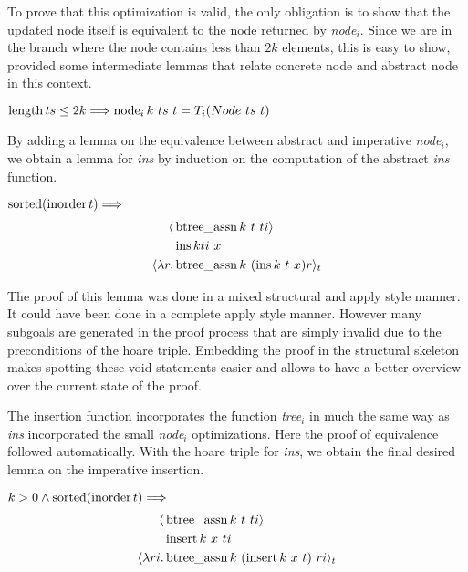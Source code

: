 To prove that this optimization is valid, the only obligation
is to show that the updated node itself is equivalent
to the node returned by \textit{node$_i$}.
Since we are in the branch where the node contains less than $2k$
elements, this is easy to show, provided some intermediate lemmas
that relate concrete node and abstract node in this context.

\begin{lemma}$\operatorname{length} ts \leq 2k \Longrightarrow
    \operatorname{node}_i k\ ts\ t = T_i (Node\ ts\ t)$
\end{lemma}

\begin{samepage}
By adding a lemma on the equivalence between abstract and imperative
\textit{node$_i$}, we obtain a lemma for \textit{ins}
by induction on the computation
of the abstract \textit{ins} function.

\begin{lemma} $\operatorname{sorted} (\operatorname{inorder} t) \Longrightarrow$ \\
    \begin{align*}
       \langle &\operatorname{btree\_assn} k\ t\ ti\rangle \\
               &\operatorname{ins} k ti\ x \\
       \langle \lambda r. &\operatorname{btree\_assn} k\ (\operatorname{ins} k\ t\ x) r\rangle_t
    \end{align*}
\end{lemma}
\end{samepage}

The proof of this lemma was done in a mixed structural and apply style manner.
It could have been done in a complete apply style manner.
However many subgoals are generated in the proof process that are
simply invalid due to the preconditions of the hoare triple.
Embedding the proof in the structural skeleton makes spotting
these void statements easier and allows to have a better
overview over the current state of the proof.

The insertion function incorporates the function \textit{tree}$_i$
in much the same way as \textit{ins} incorporated the small \textit{node}$_i$ optimizations.
Here the proof of equivalence followed automatically.
With the hoare triple for \textit{ins}, we obtain the final desired lemma
on the imperative insertion.

\begin{theorem} $k > 0 \wedge \operatorname{sorted} (\operatorname{inorder} t) \Longrightarrow$ \\
\begin{align*}
   \langle &\btreeassn k\ t\ ti\rangle \\
           &\insertfun k\ x\ ti \\
   \langle \lambda ri. &\btreeassn k\ (\insertfun k\ x\ t)\ ri\rangle_t
\end{align*}
\label{thm:imp-ins-rule}
\end{theorem}

